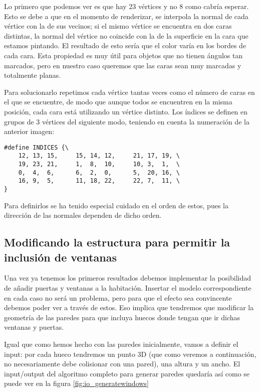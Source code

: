 Lo primero que podemos ver es que hay 23 vértices y no 8 como cabría esperar. Esto se debe a que en el momento de renderizar, se interpola la normal de cada vértice con la de sus vecinos; si el mismo vértice se encuentra en dos caras distintas, la normal del vértice no coincide con la de la superficie en la cara que estamos pintando. El resultado de esto sería que el color varía en los bordes de cada cara. Esta propiedad es muy útil para objetos que no tienen ángulos tan marcados, pero en nuestro caso queremos que las caras sean muy marcadas y totalmente planas.

Para solucionarlo repetimos cada vértice tantas veces como el número de caras en el que se encuentre, de modo que aunque todos se encuentren en la misma posición, cada cara está utilizando un vértice distinto. Los índices se definen en grupos de 3 vértices del siguiente modo, teniendo en cuenta la numeración de la anterior imagen:

\begin{lstlisting}
#define INDICES {\
    12, 13, 15,     15, 14, 12,     21, 17, 19, \
    19, 23, 21,     1,  8,  10,     10, 3,  1,  \
    0,  4,  6,      6,  2,  0,      5,  20, 16, \
    16, 9,  5,      11, 18, 22,     22, 7,  11, \
}
\end{lstlisting}

Para definirlos se ha tenido especial cuidado en el orden de estos, pues la dirección de las normales dependen de dicho orden.

\clearpage
\subsection{Modificando la estructura para permitir la inclusión de ventanas}
\label{subsec:gen2}
Una vez ya tenemos los primeros resultados debemos implementar la posibilidad de añadir puertas y ventanas a la habitación. Insertar el modelo correspondiente en cada caso no será un problema, pero para que el efecto sea convincente debemos poder ver a través de estos. Eso implica que tendremos que modificar la geometría de las paredes para que incluya huecos donde tengan que ir dichas ventanas y puertas.

Igual que como hemos hecho con las paredes inicialmente, vamos a definir el input: por cada hueco tendremos un punto 3D (que como veremos a continuación, no necesariamente debe colisionar con una pared), una altura y un ancho. El input/output del algoritmo completo para generar paredes quedaría así como se puede ver en la figura \ref{fig:io_generatewindows}

